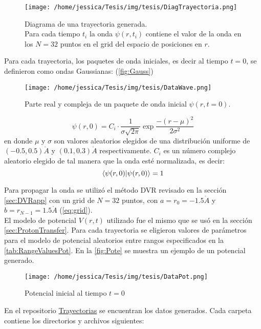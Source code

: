 \begin{figure}[!htbp]
  \centering
  \texttt{[image: /home/jessica/Tesis/img/tesis/DiagTrayectoria.png]}
  \caption{Diagrama de una trayectoria generada.\\Para cada tiempo $t_i$ la onda $\psi(r,t_i)$ contiene el valor de la onda en los $N=32$ puntos en el grid del espacio de posiciones en $r$.}
  \label{fig:DiagTraj}
\end{figure}

Para cada trayectoria, los paquetes de onda iniciales, es decir al tiempo $t=0$, se definieron como ondas Gaussianas: (\autoref{fig:Gauss})
\begin{figure}[!htbp]
  \centering
  \texttt{[image: /home/jessica/Tesis/img/tesis/DataWave.png]}
  \caption{Parte real y compleja de un paquete de onda inicial $\psi(r,t=0)$.}
  \label{fig:Gauss}
\end{figure}

\begin{equation}
  \label{eq:gaussian}
  \psi(r,0) = C_i\cdot \frac{1}{\sigma\sqrt{2\pi}}\exp{\frac{-(r-\mu)^2}{2\sigma^2}}
\end{equation}
en donde $\mu$ y $\sigma$ son valores aleatorios elegidos de una distribución uniforme de $(-0.5,0.5)\mathring{A}$ y $(0.1,0.3)\mathring{A}$ respectivamente. $C_i$ es un número complejo aleatorio elegido de tal manera que la onda esté normalizada, es decir:
$$\bra{\psi(r,0)}\ket{\psi(r,0)} = 1$$

Para propagar la onda se utilizó el método \acs{DVR} revisado en la sección \autoref{sec:DVRapp} con un grid de $N=32$ puntos, con $a=r_0=-1.5\mathring{A}$ y $b=r_{N-1}=1.5\mathring{A}$ (\autoref{eq:grid}).
\\
El modelo de potencial $V(r,t)$ utilizado fue el mismo que se usó en la sección \autoref{sec:ProtonTransfer}. Para cada trayectoria se eligieron valores de parámetros para el modelo de potencial aleatorios entre rangos especificados en la \autoref{tab:RangeValuesPot}. En la \autoref{fig:Pote} se muestra un ejemplo de un potencial generado.
\begin{figure}[!htbp]
  \centering
  \texttt{[image: /home/jessica/Tesis/img/tesis/DataPot.png]}
  \caption{Potencial inicial al tiempo $t=0$}
  \label{fig:Pote}
\end{figure}

En el repositorio \href{https://github.com/Jessi-MM/PropagatorLearning/tree/main/Data_Gaussian}{\faGithub Trayectorias} se encuentran los datos generados. Cada carpeta contiene los directorios y archivos siguientes:

